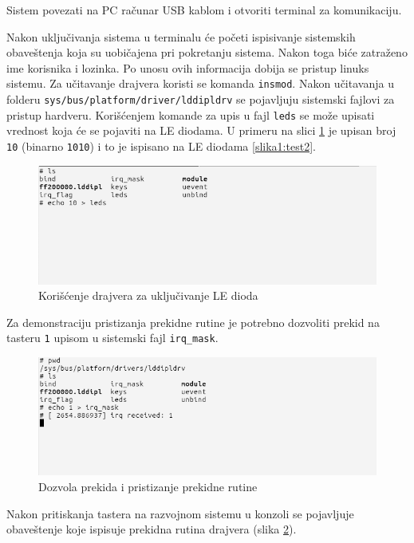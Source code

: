Sistem povezati na PC računar USB kablom i otvoriti terminal za komunikaciju.

Nakon uključivanja sistema u terminalu će početi ispisivanje sistemskih obaveštenja koja su uobičajena pri pokretanju sistema. Nakon toga biće zatraženo ime korisnika i lozinka. Po unosu ovih informacija dobija se pristup linuks sistemu. Za učitavanje drajvera koristi se komanda \texttt{insmod}. Nakon učitavanja u folderu \texttt{sys/bus/platform/driver/lddipldrv} se pojavljuju sistemski fajlovi za pristup hardveru. Korišćenjem komande za upis u fajl \texttt{leds} se može upisati vrednost koja će se pojaviti na LE diodama. U primeru na slici \ref{slika1:test1} je upisan broj \texttt{10} (binarno \texttt{1010}) i to je ispisano na LE diodama \ref{slika1:test2}.
\begin{figure}[h!]
\centering
\includegraphics[scale=0.5]{img/test1.png}
\caption{Korišćenje drajvera za uključivanje LE dioda}
\label{slika1:test1}
\end{figure}
Za demonstraciju pristizanja prekidne rutine je potrebno dozvoliti prekid na tasteru \texttt{1} upisom u sistemski fajl \texttt{irq\_mask}.
\begin{figure}[h!]
\centering
\includegraphics[scale=0.5]{img/test3.png}
\caption{Dozvola prekida i pristizanje prekidne rutine}
\label{slika1:test3}
\end{figure}
\pagebreak
 Nakon pritiskanja tastera na razvojnom sistemu u konzoli se pojavljuje obaveštenje koje ispisuje prekidna rutina drajvera (slika \ref{slika1:test3}).\\

